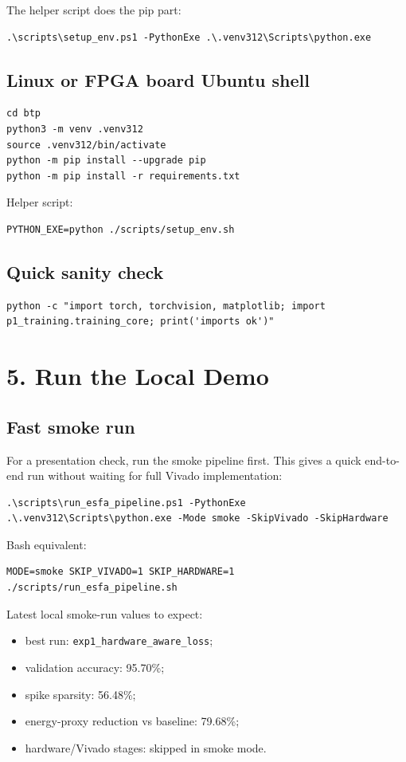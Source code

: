 \documentclass[11pt]{article}
\begin{document}
The helper script does the pip part:
\begin{lstlisting}[style=cmd]
.\scripts\setup_env.ps1 -PythonExe .\.venv312\Scripts\python.exe
\end{lstlisting}

\subsection{Linux or FPGA board Ubuntu shell}
\begin{lstlisting}[style=cmd]
cd btp
python3 -m venv .venv312
source .venv312/bin/activate
python -m pip install --upgrade pip
python -m pip install -r requirements.txt
\end{lstlisting}

Helper script:
\begin{lstlisting}[style=cmd]
PYTHON_EXE=python ./scripts/setup_env.sh
\end{lstlisting}

\subsection{Quick sanity check}
\begin{lstlisting}[style=cmd]
python -c "import torch, torchvision, matplotlib; import p1_training.training_core; print('imports ok')"
\end{lstlisting}

\section{5. Run the Local Demo}
\subsection{Fast smoke run}
For a presentation check, run the smoke pipeline first. This gives a quick
end-to-end run without waiting for full Vivado implementation:
\begin{lstlisting}[style=cmd]
.\scripts\run_esfa_pipeline.ps1 -PythonExe .\.venv312\Scripts\python.exe -Mode smoke -SkipVivado -SkipHardware
\end{lstlisting}

Bash equivalent:
\begin{lstlisting}[style=cmd]
MODE=smoke SKIP_VIVADO=1 SKIP_HARDWARE=1 ./scripts/run_esfa_pipeline.sh
\end{lstlisting}

Latest local smoke-run values to expect:
\begin{itemize}[leftmargin=*]
\item best run: \texttt{exp1\_hardware\_aware\_loss};
\item validation accuracy: 95.70\%;
\item spike sparsity: 56.48\%;
\item energy-proxy reduction vs baseline: 79.68\%;
\item hardware/Vivado stages: skipped in smoke mode.
\end{itemize}
\end{document}
